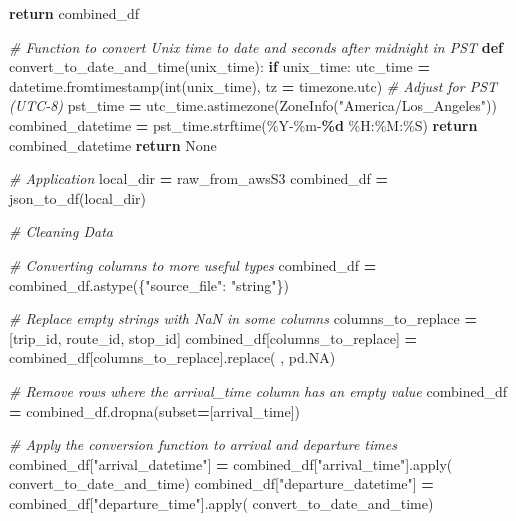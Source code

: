 \documentclass[
  12pt,
]{article}
\newenvironment{Shaded}{\begin{snugshade}}{\end{snugshade}}
\newcommand{\BuiltInTok}[1]{#1}
\newcommand{\CommentTok}[1]{\textcolor[rgb]{0.56,0.35,0.01}{\textit{#1}}}
\newcommand{\ControlFlowTok}[1]{\textcolor[rgb]{0.13,0.29,0.53}{\textbf{#1}}}
\newcommand{\KeywordTok}[1]{\textcolor[rgb]{0.13,0.29,0.53}{\textbf{#1}}}
\newcommand{\NormalTok}[1]{#1}
\newcommand{\OperatorTok}[1]{\textcolor[rgb]{0.81,0.36,0.00}{\textbf{#1}}}
\newcommand{\SpecialCharTok}[1]{\textcolor[rgb]{0.81,0.36,0.00}{\textbf{#1}}}
\newcommand{\StringTok}[1]{\textcolor[rgb]{0.31,0.60,0.02}{#1}}
\newcommand{\VariableTok}[1]{\textcolor[rgb]{0.00,0.00,0.00}{#1}}
\begin{document}
\begin{Shaded}
\begin{Highlighting}[]
    \ControlFlowTok{return}\NormalTok{ combined\_df}

\CommentTok{\# Function to convert Unix time to date and seconds after midnight in PST}
\KeywordTok{def}\NormalTok{ convert\_to\_date\_and\_time(unix\_time):}
    \ControlFlowTok{if}\NormalTok{ unix\_time:}
\NormalTok{        utc\_time }\OperatorTok{=}\NormalTok{ datetime.fromtimestamp(}\BuiltInTok{int}\NormalTok{(unix\_time), tz }\OperatorTok{=}\NormalTok{ timezone.utc)}
        \CommentTok{\# Adjust for PST (UTC{-}8)}
\NormalTok{        pst\_time }\OperatorTok{=}\NormalTok{ utc\_time.astimezone(ZoneInfo(}\StringTok{"America/Los\_Angeles"}\NormalTok{)) }
\NormalTok{        combined\_datetime }\OperatorTok{=}\NormalTok{ pst\_time.strftime(}\StringTok{\textquotesingle{}\%Y{-}\%m{-}}\SpecialCharTok{\%d}\StringTok{ \%H:\%M:\%S\textquotesingle{}}\NormalTok{)}
        \ControlFlowTok{return}\NormalTok{ combined\_datetime}
    \ControlFlowTok{return} \VariableTok{None}

\CommentTok{\# Application}
\NormalTok{local\_dir }\OperatorTok{=} \StringTok{\textquotesingle{}raw\_from\_awsS3\textquotesingle{}}
\NormalTok{combined\_df }\OperatorTok{=}\NormalTok{ json\_to\_df(local\_dir)}

\CommentTok{\# Cleaning Data}

\CommentTok{\# Converting columns to more useful types}
\NormalTok{combined\_df }\OperatorTok{=}\NormalTok{ combined\_df.astype(\{}\StringTok{"source\_file"}\NormalTok{: }\StringTok{"string"}\NormalTok{\})}

\CommentTok{\# Replace empty strings with NaN in some columns}
\NormalTok{columns\_to\_replace }\OperatorTok{=}\NormalTok{ [}\StringTok{\textquotesingle{}trip\_id\textquotesingle{}}\NormalTok{, }\StringTok{\textquotesingle{}route\_id\textquotesingle{}}\NormalTok{, }\StringTok{\textquotesingle{}stop\_id\textquotesingle{}}\NormalTok{]}
\NormalTok{combined\_df[columns\_to\_replace] }\OperatorTok{=}\NormalTok{ combined\_df[columns\_to\_replace].replace(}
  \StringTok{\textquotesingle{}\textquotesingle{}}\NormalTok{, pd.NA)}

\CommentTok{\# Remove rows where the arrival\_time column has an empty value}
\NormalTok{combined\_df }\OperatorTok{=}\NormalTok{ combined\_df.dropna(subset}\OperatorTok{=}\NormalTok{[}\StringTok{\textquotesingle{}arrival\_time\textquotesingle{}}\NormalTok{])}

\CommentTok{\# Apply the conversion function to arrival and departure times}
\NormalTok{combined\_df[}\StringTok{"arrival\_datetime"}\NormalTok{] }\OperatorTok{=}\NormalTok{ combined\_df[}\StringTok{"arrival\_time"}\NormalTok{].}\BuiltInTok{apply}\NormalTok{(}
\NormalTok{  convert\_to\_date\_and\_time)}
\NormalTok{combined\_df[}\StringTok{"departure\_datetime"}\NormalTok{] }\OperatorTok{=}\NormalTok{ combined\_df[}\StringTok{"departure\_time"}\NormalTok{].}\BuiltInTok{apply}\NormalTok{(}
\NormalTok{  convert\_to\_date\_and\_time)}


\end{Highlighting}
\end{Shaded}
\end{document}

